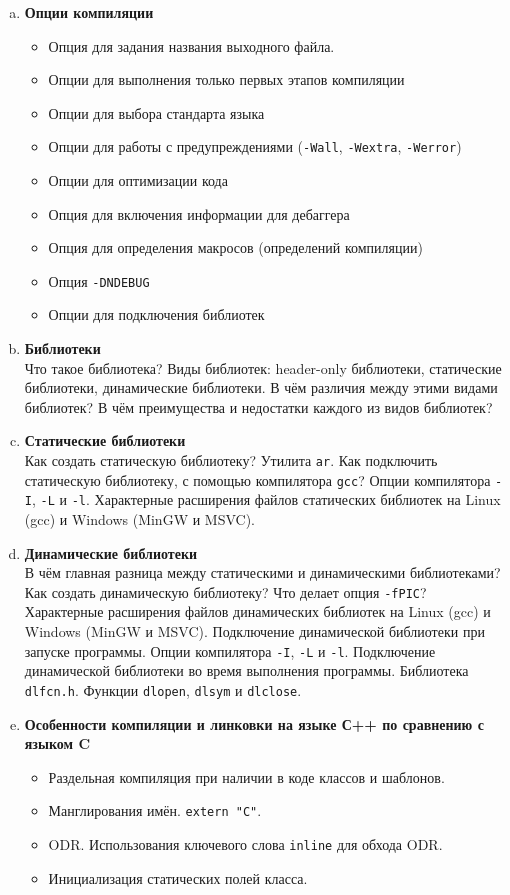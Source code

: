 \documentclass{article}
\begin{document}
\begin{enumerate}
\begin{enumerate}[a.]
\item \textbf{Опции компиляции}
\begin{itemize}
\item Опция для задания названия выходного файла.
\item Опции для выполнения только первых этапов компиляции
\item Опции для выбора стандарта языка
\item Опции для работы с предупреждениями (\texttt{-Wall}, \texttt{-Wextra}, \texttt{-Werror})
\item Опции для оптимизации кода
\item Опция для включения информации для дебаггера
\item Опция для определения макросов (определений компиляции)
\item Опция \texttt{-DNDEBUG}
\item Опции для подключения библиотек
\end{itemize}

\item \textbf{Библиотеки}\\
Что такое библиотека? Виды библиотек: header-only библиотеки, статические библиотеки, динамические библиотеки. В чём различия между этими видами библиотек? В чём преимущества и недостатки каждого из видов библиотек?

\item \textbf{Статические библиотеки}\\
Как создать статическую библиотеку? Утилита \texttt{ar}. Как подключить статическую библиотеку, с помощью компилятора \texttt{gcc}? Опции компилятора \texttt{-I}, \texttt{-L} и \texttt{-l}. Характерные расширения файлов статических библиотек на Linux (gcc) и Windows (MinGW и MSVC). 

\item \textbf{Динамические библиотеки}\\
В чём главная разница между статическими и динамическими библиотеками? Как создать динамическую библиотеку? Что делает опция \texttt{-fPIC}? Характерные расширения файлов динамических библиотек на Linux (gcc) и Windows (MinGW и MSVC). Подключение динамической библиотеки при запуске программы. Опции компилятора \texttt{-I}, \texttt{-L} и \texttt{-l}. Подключение динамической библиотеки во время выполнения программы. Библиотека \texttt{dlfcn.h}. Функции \texttt{dlopen}, \texttt{dlsym} и \texttt{dlclose}.


\item \textbf{Особенности компиляции и линковки на языке С++ по сравнению с языком C}
\begin{itemize}
\item Раздельная компиляция при наличии в коде классов и шаблонов.
\item Манглирования имён. \texttt{extern "C"}.
\item ODR. Использования ключевого слова \texttt{inline} для обхода ODR.
\item Инициализация статических полей класса.
\end{itemize}


\end{enumerate}
\end{enumerate}
\end{document}
